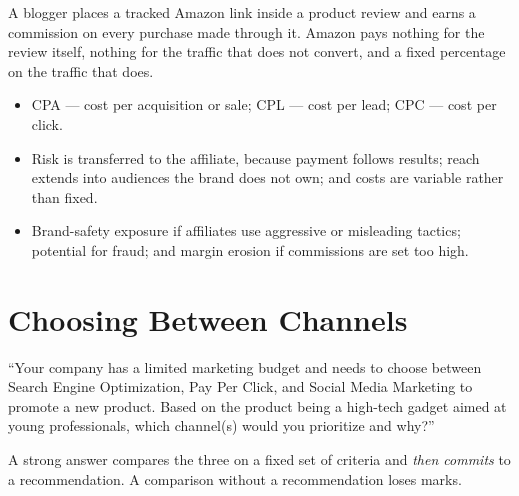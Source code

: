 \documentclass{MMTextbook}
\begin{document}
\begin{examplebox}
A blogger places a tracked Amazon link inside a product review and earns a
commission on every purchase made through it. Amazon pays nothing for the
review itself, nothing for the traffic that does not convert, and a fixed
percentage on the traffic that does.
\end{examplebox}

\begin{itemize}
\item {} CPA --- cost per acquisition or sale; CPL --- cost
      per lead; CPC --- cost per click.
\item {} Risk is transferred to the affiliate, because payment
      follows results; reach extends into audiences the brand does not own; and
      costs are variable rather than fixed.
\item {} Brand-safety exposure if affiliates use aggressive or
      misleading tactics; potential for fraud; and margin erosion if
      commissions are set too high.
\end{itemize}

\section{Choosing Between Channels}

\begin{exambox}
``Your company has a limited marketing budget and needs to choose between
Search Engine Optimization, Pay Per Click, and Social Media Marketing to
promote a new product. Based on the product being a high-tech gadget aimed at
young professionals, which channel(s) would you prioritize and why?''

\smallskip
A strong answer compares the three on a fixed set of criteria and \emph{then
commits} to a recommendation. A comparison without a recommendation loses marks.
\end{exambox}
\end{document}
